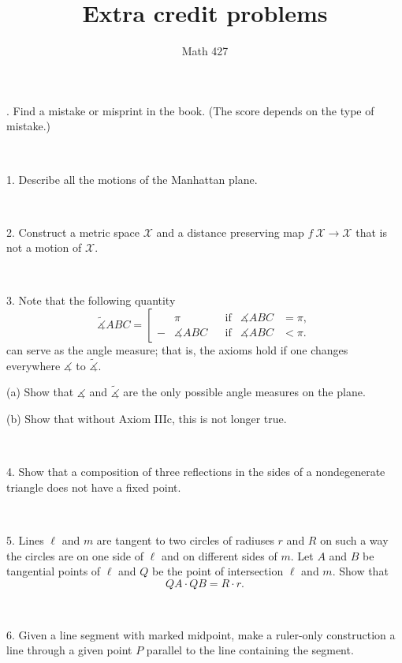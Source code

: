 \documentclass[oneside,a4paper]{article}
\begin{document}
\title{Extra credit problems}
\author{Math 427}
\date{}
\maketitle


. Find a mistake or misprint in the book.
(The score depends on the type of mistake.)

\ 

\noi %
{1.} Describe all the motions of the Manhattan plane.

\ 

\noi %
{2.} %
Construct a metric space $\mathcal X$ and a distance preserving map $f\:\mathcal X\to \mathcal X$ that is not a motion of $\mathcal X$.

\ 

\noi %
{3.} Note that the following quantity 
$$\tilde
\measuredangle ABC=\left[
\begin{aligned}
&\pi&&\text{if}&\measuredangle ABC&=\pi,
\\
-&\measuredangle ABC&&\text{if}&\measuredangle ABC&<\pi.
\end{aligned}
\right.$$
can serve as the angle measure; 
that is, the axioms hold if one changes everywhere $\measuredangle$ to $\tilde\measuredangle$.

\noi (a) Show that $\measuredangle$ and $\tilde\measuredangle$ are the only possible angle measures on the plane. 

\noi (b) Show that without Axiom IIIc, this is not longer true.

\ 

\noi %
{4.} %
Show that a composition of three reflections in the sides of a nondegenerate triangle does not have a fixed point.

\ 

\noi %
{5.} %
Lines $\ell$ and $m$ are tangent to two circles of radiuses $r$ and $R$ on such
a way the circles are on one side of $\ell$ and on different sides of $m$. 
Let $A$ and $B$ be
tangential points of $\ell$ and $Q$ be the point of intersection $\ell$ and $m$. 
Show that
$$QA\cdot QB = R\cdot r.$$

\ 

\noi %
{6.} %
Given a line segment with marked midpoint, make a ruler-only construction a line through a given point $P$ parallel to the line containing the segment.
\end{document}
